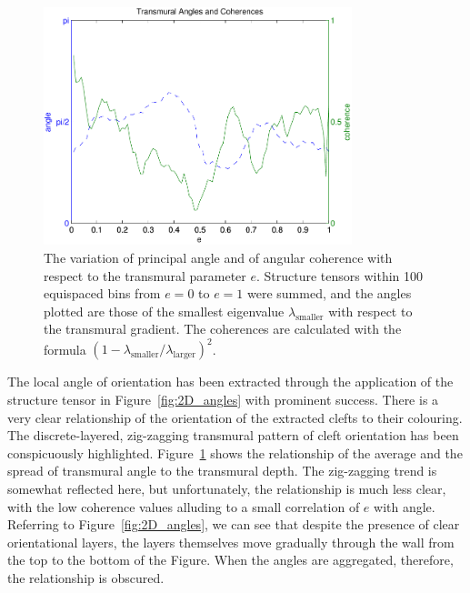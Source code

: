     \begin{figure}[htbp]
      \centering
      \includegraphics[width=0.8\textwidth]{Ch7/Figs/angles_and_coherences_vs_e}
      \caption{The variation of principal angle and of angular coherence with respect to the transmural parameter $e$. Structure tensors within 100 equispaced bins from $e=0$ to $e=1$ were summed, and the angles plotted are those of the smallest eigenvalue $\lambda_{\text{smaller}}$ with respect to the transmural gradient. The coherences are calculated with the formula $(1 - \lambda_{\text{smaller}}/\lambda_{\text{larger}})^2$.}
      \label{fig:angles_and_coherences_vs_e}
    \end{figure}
    
    The local angle of orientation has been extracted through the application of the structure tensor in Figure~\ref{fig:2D_angles} with prominent success. There is a very clear relationship of the orientation of the extracted clefts to their colouring. The discrete-layered, zig-zagging transmural pattern of cleft orientation has been conspicuously highlighted. Figure~\ref{fig:angles_and_coherences_vs_e} shows the relationship of the average and the spread of transmural angle to the transmural depth. The zig-zagging trend is somewhat reflected here, but unfortunately, the relationship is much less clear, with the low coherence values alluding to a small correlation of $e$ with angle. Referring to Figure~\ref{fig:2D_angles}, we can see that despite the presence of clear orientational layers, the layers themselves move gradually through the wall from the top to the bottom of the Figure. When the angles are aggregated, therefore, the relationship is obscured.
  
